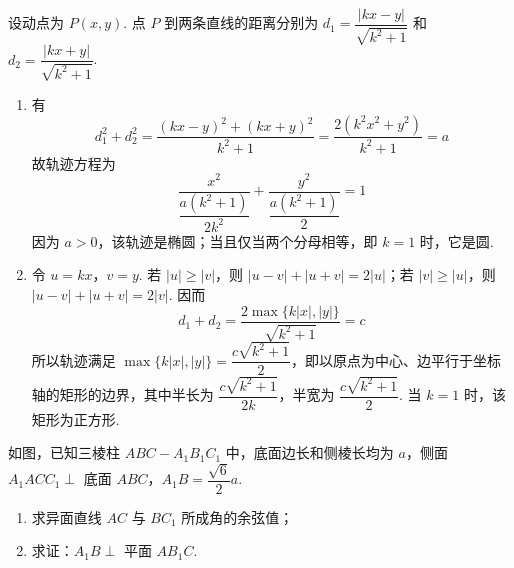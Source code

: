 \begin{solution}
设动点为 \(P(x,y)\). 点 \(P\) 到两条直线的距离分别为 \(d_{1}=\dfrac{\lvert kx-y\rvert}{\sqrt{k^{2}+1}}\) 和 \(d_{2}=\dfrac{\lvert kx+y\rvert}{\sqrt{k^{2}+1}}\).

\begin{enumerate}
\item 有
\[
d_{1}^{2}+d_{2}^{2}=\frac{(kx-y)^{2}+(kx+y)^{2}}{k^{2}+1}=\frac{2(k^{2}x^{2}+y^{2})}{k^{2}+1}=a
\]
故轨迹方程为
\[
\frac{x^{2}}{\dfrac{a(k^{2}+1)}{2k^{2}}}+\frac{y^{2}}{\dfrac{a(k^{2}+1)}{2}}=1
\]
因为 \(a>0\)，该轨迹是椭圆；当且仅当两个分母相等，即 \(k=1\) 时，它是圆.
\item 令 \(u=kx\)，\(v=y\). 若 \(\lvert u\rvert\geqslant\lvert v\rvert\)，则 \(\lvert u-v\rvert+\lvert u+v\rvert=2\lvert u\rvert\)；若 \(\lvert v\rvert\geqslant\lvert u\rvert\)，则 \(\lvert u-v\rvert+\lvert u+v\rvert=2\lvert v\rvert\). 因而
\[
d_{1}+d_{2}=\frac{2\max\{k\lvert x\rvert,\lvert y\rvert\}}{\sqrt{k^{2}+1}}=c
\]
所以轨迹满足 \(\max\{k\lvert x\rvert,\lvert y\rvert\}=\dfrac{c\sqrt{k^{2}+1}}{2}\)，即以原点为中心、边平行于坐标轴的矩形的边界，其中半长为 \(\dfrac{c\sqrt{k^{2}+1}}{2k}\)，半宽为 \(\dfrac{c\sqrt{k^{2}+1}}{2}\). 当 \(k=1\) 时，该矩形为正方形.
\end{enumerate}
\end{solution}

\begin{problem}
如图，已知三棱柱 \(ABC-A_{1}B_{1}C_{1}\) 中，底面边长和侧棱长均为 \(a\)，侧面 \(A_{1}ACC_{1}\perp\) 底面 \(ABC\)，\(A_{1}B=\dfrac{\sqrt{6}}{2}a\).

\begin{enumerate}
\item 求异面直线 \(AC\) 与 \(BC_{1}\) 所成角的余弦值；
\item 求证：\(A_{1}B\perp\) 平面 \(AB_{1}C\).
\end{enumerate}

\begin{center}
\end{center}
\end{problem}

